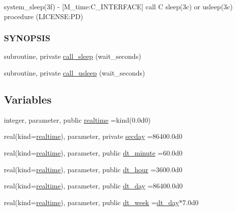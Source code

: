 \begin{DoxyCompactItemize}
\begin{DoxyCompactList}
system\+\_\+sleep(3f) -\/ \mbox{[}M\+\_\+time\+:C\+\_\+\+I\+N\+T\+E\+R\+F\+A\+CE\mbox{]} call C sleep(3c) or usleep(3c) procedure (L\+I\+C\+E\+N\+SE\+:PD) \subsubsection*{S\+Y\+N\+O\+P\+S\+IS}\end{DoxyCompactList}\item 
subroutine, private \mbox{\hyperlink{namespacem__time_af558bfc1fd5b13a6b879b3969866956f}{call\+\_\+sleep}} (wait\+\_\+seconds)
\item 
subroutine, private \mbox{\hyperlink{namespacem__time_ae63783f7479d2f5093c8031d38ce4304}{call\+\_\+usleep}} (wait\+\_\+seconds)
\end{DoxyCompactItemize}
\subsection*{Variables}
\begin{DoxyCompactItemize}
\item 
integer, parameter, public \mbox{\hyperlink{namespacem__time_ac10ea9e8d59ec74eaa7d89f2517d7422}{realtime}} =kind(0.\+0d0)
\item 
real(kind=\mbox{\hyperlink{namespacem__time_ac10ea9e8d59ec74eaa7d89f2517d7422}{realtime}}), parameter, private \mbox{\hyperlink{namespacem__time_a48130b5a95a3f2e776269dcee1426797}{secday}} =86400.\+0d0
\item 
real(kind=\mbox{\hyperlink{namespacem__time_ac10ea9e8d59ec74eaa7d89f2517d7422}{realtime}}), parameter, public \mbox{\hyperlink{namespacem__time_a9fe6fbb44e2779a2fcf96fba36c08918}{dt\+\_\+minute}} =60.\+0d0
\item 
real(kind=\mbox{\hyperlink{namespacem__time_ac10ea9e8d59ec74eaa7d89f2517d7422}{realtime}}), parameter, public \mbox{\hyperlink{namespacem__time_aa0ca2172092f5e7dcc9b8524e6516fd8}{dt\+\_\+hour}} =3600.\+0d0
\item 
real(kind=\mbox{\hyperlink{namespacem__time_ac10ea9e8d59ec74eaa7d89f2517d7422}{realtime}}), parameter, public \mbox{\hyperlink{namespacem__time_a97725f8d657c24badff19a794f323a6b}{dt\+\_\+day}} =86400.\+0d0
\item 
real(kind=\mbox{\hyperlink{namespacem__time_ac10ea9e8d59ec74eaa7d89f2517d7422}{realtime}}), parameter, public \mbox{\hyperlink{namespacem__time_a3d53519e90264faccdae67e389ffc003}{dt\+\_\+week}} =\mbox{\hyperlink{namespacem__time_a97725f8d657c24badff19a794f323a6b}{dt\+\_\+day}}$\ast$7.\+0d0
\end{DoxyCompactItemize}


